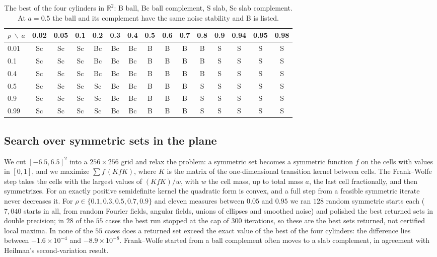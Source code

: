 \documentclass[11pt]{amsart}
\theoremstyle{remark}
\newcommand{\R}{\mathbb{R}}
\begin{document}
\begin{table}[tbp]
\centering
\caption{The best of the four cylinders in $\R^2$: B ball, Bc ball complement, S slab, Sc slab complement. At
$a=0.5$ the ball and its complement have the same noise stability and B is listed.}
\label{tab:winners}
\small
\setlength{\tabcolsep}{2.6pt}
\begin{tabular}{lcccccccccccccc}
\toprule
$\rho\ \backslash\ a$ & 0.02 & 0.05 & 0.1 & 0.2 & 0.3 & 0.4 & 0.5 & 0.6 & 0.7 & 0.8 & 0.9 & 0.94 & 0.95 & 0.98\\
\midrule
0.01 & Sc & Sc & Sc & Bc & Bc & Bc & B & B & B & B & S & S & S & S\\
0.1 & Sc & Sc & Sc & Bc & Bc & Bc & B & B & B & B & S & S & S & S\\
0.4 & Sc & Sc & Sc & Bc & Bc & Bc & B & B & B & B & S & S & S & S\\
0.5 & Sc & Sc & Sc & Sc & Bc & Bc & B & B & B & S & S & S & S & S\\
0.9 & Sc & Sc & Sc & Sc & Bc & Bc & B & B & B & S & S & S & S & S\\
0.99 & Sc & Sc & Sc & Sc & Bc & Bc & B & B & B & S & S & S & S & S\\
\bottomrule
\end{tabular}
\end{table}

\subsection*{Search over symmetric sets in the plane}
We cut $[-6.5,6.5]^2$ into a $256\times256$ grid and relax the problem: a symmetric set becomes a symmetric function
$f$ on the cells with values in $[0,1]$, and we maximize $\sum f\,(KfK)$, where $K$ is the matrix of the
one-dimensional transition kernel between cells. The Frank--Wolfe step takes the cells with the largest values of
$(KfK)/w$, with $w$ the cell mass, up to total mass $a$, the last cell fractionally, and then symmetrizes. For an
exactly positive semidefinite kernel the quadratic form is convex, and a full step from a feasible symmetric iterate
never decreases it. For $\rho\in\{0.1,0.3,
0.5,0.7,0.9\}$ and eleven measures between $0.05$ and $0.95$ we ran $128$ random symmetric starts each ($7{,}040$ starts
in all, from random Fourier fields, angular fields, unions of ellipses and smoothed noise) and polished the best returned
sets in double precision; in $28$ of the $55$ cases the best run stopped at the cap of $300$ iterations, so these are
the best sets returned, not certified local maxima. In none of the $55$ cases does a returned set exceed the exact
value of the best of the four cylinders: the difference lies between $-1.6\times10^{-4}$ and $-8.9\times10^{-8}$. Frank--Wolfe started from a
ball complement often moves to a slab complement, in agreement with Heilman's second-variation result.
\end{document}
